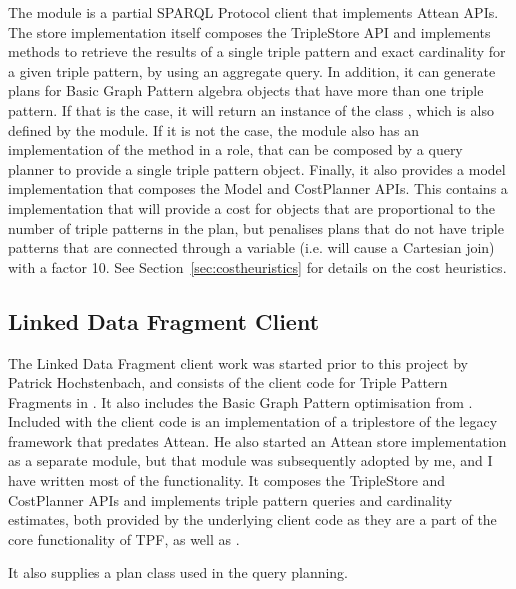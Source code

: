 \begin{subappendices}
The  module is a partial SPARQL
Protocol client that implements Attean APIs. The store implementation
itself composes the \mbox{TripleStore} API and implements methods to retrieve
the results of a single triple pattern and exact cardinality for a
given triple pattern, by using an aggregate query. In addition, it can
generate plans for Basic Graph Pattern algebra objects that have more
than one triple pattern. If that is the case, it will return an
instance of the class , which is
also defined by the module. If it is not the case, the module also has
an implementation of the  method in a
 role, that can be
composed by a query planner to provide a single triple pattern
 object. Finally, it also provides a
model implementation that composes the Model and \mbox{CostPlanner}
APIs. This contains a  implementation that will
provide a cost for  objects that are
proportional to the number of triple patterns in the plan, but
penalises plans that do not have triple patterns that are connected
through a variable (i.e. will cause a Cartesian join) with a factor
10. See Section~\ref{sec:costheuristics} for details on the cost
heuristics.

\subsection{Linked Data Fragment Client}\label{sec:ldfclient}

The Linked Data Fragment client work was started prior to this project
by Patrick Hochstenbach, and consists of the client code for Triple
Pattern Fragments in . It also includes the Basic
Graph Pattern optimisation from \cite{verborgh2014querying}. Included with the client
code is an implementation of a triplestore of the legacy
 framework that predates Attean. He also started
an Attean store implementation  as a
separate module, but that module was subsequently adopted by me, and I
have written most of the functionality. It composes the \mbox{TripleStore}
and \mbox{CostPlanner} APIs and implements triple pattern queries and
cardinality estimates, both provided by the underlying client code as
they are a part of the core functionality of TPF,
as well as .

It also supplies a plan class 
used in the query planning. 


\end{subappendices}


